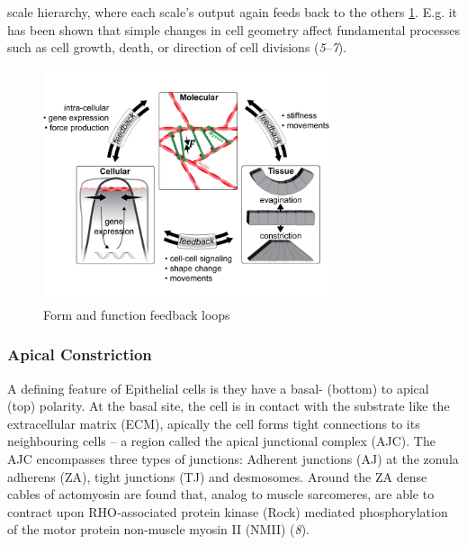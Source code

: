 \documentclass[11pt,singlespacinge,twoside]{reedthesis} %
\begin{document}
scale hierarchy, where each scale's output again feeds back to the others \ref{fig:feedb}. E.g. it has been shown that simple changes in cell geometry affect fundamental processes such as cell growth, death, or direction of cell divisions (\emph{5}--\emph{7}).
\begin{figure}

{\centering \includegraphics[width=0.75\textwidth]{figures/intro/feedback} 

}

\caption{Form and function feedback loops}\label{fig:feedb}
\end{figure}
\hypertarget{apical-constriction}{%
\subsubsection{Apical Constriction}\label{apical-constriction}}

A defining feature of Epithelial cells is they have a basal- (bottom) to apical (top) polarity. At the basal site, the cell is in contact with the substrate like the extracellular matrix (ECM), apically the cell forms tight connections to its neighbouring cells -- a region called the apical junctional complex (AJC). The AJC encompasses three types of junctions: Adherent junctions (AJ) at the zonula adherens (ZA), tight junctions (TJ) and desmosomes. Around the ZA dense cables of actomyosin are found that, analog to muscle sarcomeres, are able to contract upon RHO‑associated protein kinase (Rock) mediated phosphorylation of the motor protein non-muscle myosin II (NMII) (\emph{8}).
\end{document}
